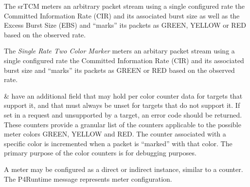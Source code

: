 \documentclass[11pt]{article}
\begin{document}
{%
The srTCM meters an arbitrary packet stream using a single configured rate \textemdash{}
the Committed Information Rate (CIR) and its associated burst size \textemdash{} as well
as the Excess Burst Size (EBS) and \textquotedblleft{}marks\textquotedblright{} its packets as GREEN, YELLOW or RED
based on the observed rate.%

The \emph{Single Rate Two Color Marker} meters an arbitary packet stream using a
single configured rate \textemdash{} the Committed Information Rate (CIR) and its
associated burst size \textemdash{} and \textquotedblleft{}marks\textquotedblright{} its packets as GREEN or RED based on the
observed rate.%

 \&  have an additional field  that
may hold per color counter data for targets that support it, and that must
always be unset for targets that do not support it. If set in a request and
unsupported by a target, an  error code should be returned.
These counters provide a granular list of the counters applicable to the
possible meter colors GREEN, YELLOW and RED. The counter associated with a
specific color is incremented when a packet is \textquotedblleft{}marked\textquotedblright{} with that color. The
primary purpose of the color counters is for debugging purposes.%

A meter may be configured as a direct or indirect instance, similar to a
counter. The  P4Runtime message represents meter configuration.%

}
\end{document}
